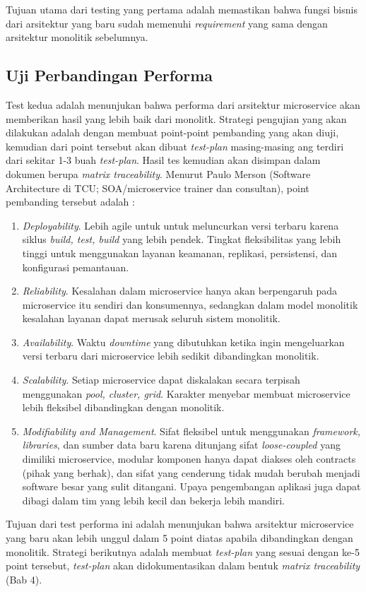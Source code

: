 Tujuan utama dari testing yang pertama adalah memastikan bahwa fungsi bisnis dari arsitektur yang baru sudah memenuhi \textit{requirement} yang sama dengan arsitektur monolitik sebelumnya.
\subsection{Uji Perbandingan Performa}
Test kedua adalah menunjukan bahwa performa dari arsitektur microservice akan memberikan hasil yang lebih baik dari monolitk. Strategi pengujian yang akan dilakukan adalah dengan membuat point-point pembanding yang akan diuji, kemudian dari point tersebut akan dibuat \textit{test-plan} masing-masing ang terdiri dari sekitar 1-3 buah \textit{test-plan}. Hasil tes kemudian akan disimpan dalam dokumen berupa \textit{matrix traceability}.
Menurut Paulo Merson (Software Architecture di TCU; SOA/microservice trainer dan consultan), point pembanding tersebut adalah \cite{12}:
\begin{enumerate}[leftmargin=*]
	\item \textit{Deployability}. Lebih agile untuk untuk meluncurkan versi terbaru karena siklus \textit{build, test, build} yang lebih pendek. Tingkat fleksibilitas yang lebih tinggi untuk menggunakan layanan keamanan, replikasi, persistensi, dan konfigurasi pemantauan.
	\item \textit{Reliability}. Kesalahan dalam microservice hanya akan berpengaruh pada microservice itu sendiri dan konsumennya, sedangkan dalam model monolitik kesalahan layanan dapat merusak seluruh sistem monolitik.
	\item \textit{Availability}. Waktu \textit{downtime} yang dibutuhkan ketika ingin mengeluarkan versi terbaru dari microservice lebih sedikit dibandingkan monolitik.
	\item \textit{Scalability}. Setiap microservice dapat diskalakan secara terpisah menggunakan \textit{pool, cluster, grid}. Karakter menyebar membuat microservice lebih fleksibel dibandingkan dengan monolitik.
	\item \textit{Modifiability and Management}. Sifat fleksibel untuk menggunakan \textit{framework, libraries}, dan sumber data baru karena ditunjang sifat \textit{loose-coupled} yang dimiliki microservice, modular komponen hanya dapat diakses oleh contracts (pihak yang berhak), dan sifat yang cenderung tidak mudah berubah menjadi software besar yang sulit ditangani. Upaya pengembangan aplikasi juga dapat dibagi dalam tim yang lebih kecil dan bekerja lebih mandiri. 
\end{enumerate}

Tujuan dari test performa ini adalah menunjukan bahwa arsitektur microservice yang baru akan lebih unggul dalam 5 point diatas apabila dibandingkan dengan monolitik.
Strategi berikutnya adalah membuat \textit{test-plan} yang sesuai dengan ke-5 point tersebut, \textit{test-plan} akan didokumentasikan dalam bentuk \textit{matrix traceability} (Bab 4).
\newpage